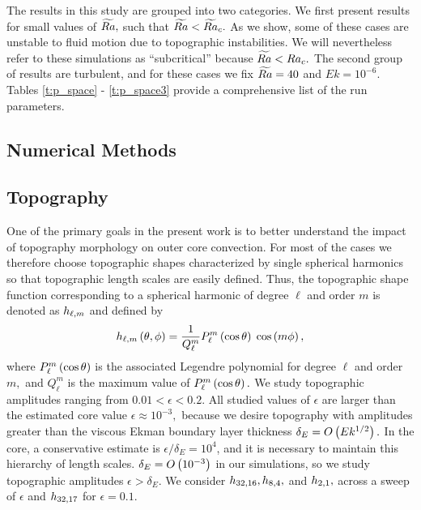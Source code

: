 The results in this study are grouped into two categories. We first present results for small values of $\widetilde{Ra},$ such that $\widetilde{Ra}<\widetilde{Ra}_{c}.$
As we show, some of these cases are unstable to fluid motion due to topographic instabilities. We will nevertheless refer to these simulations as ``subcritical'' because $\widetilde{Ra}<Ra_{c}.$
The second group of results are turbulent, and for these cases we fix $\widetilde{Ra} = 40$ and $Ek = 10^{-6}$. Tables \ref{t:p_space} - \ref{t:p_space3} provide a comprehensive list of the run parameters.


\subsection{Numerical Methods}



\subsection{Topography}




One of the primary goals in the present work is to better understand the impact of topography morphology on outer core convection.  
For most of the cases we therefore choose topographic shapes characterized by single spherical harmonics so that topographic length scales are easily defined. Thus, the topographic shape function corresponding to a spherical harmonic of degree $\ell$ and order $m$ is denoted as $h_{\ell ,m}$ and defined by
\begin{equation}
	h_{\ell,m}\left ( \theta,\phi\right ) = \frac{1}{Q_{\ell}^{m}}P_{\ell}^{m} \left ( \cos{\theta}\right )\; \cos\left ( m \phi\right ),
	\label{e:hlm}
\end{equation}
where $P_{\ell}^{m}\left ( \cos\theta\right ) $ is the associated Legendre polynomial for degree $\ell$ and order $m,$ and $Q_{\ell}^{m}$ is the maximum value of $P_{\ell}^{m}\left ( \cos\theta\right ) .$
We study topographic amplitudes ranging from $0.01<\epsilon<0.2.$ All studied values of $\epsilon$ are larger than the estimated core value $\epsilon \approx 10^{-3},$ because we desire topography with amplitudes greater than the viscous Ekman boundary layer thickness $\delta_{E}=O\left ( Ek^{1/2}\right ).$ In the core, a conservative estimate is $\epsilon /\delta_{E}=10^{4}$, and it is necessary to maintain this hierarchy of length scales. $\delta_{E}= O\left ( 10^{-3}\right ) $ in our simulations, so we study topographic amplitudes $\epsilon >\delta_{E}.$
We consider $h_{32,16},h_{8,4},$ and $h_{2,1},$ across a sweep of $\epsilon$ and $h_{32,17}$ for $\epsilon  = 0.1$. 


